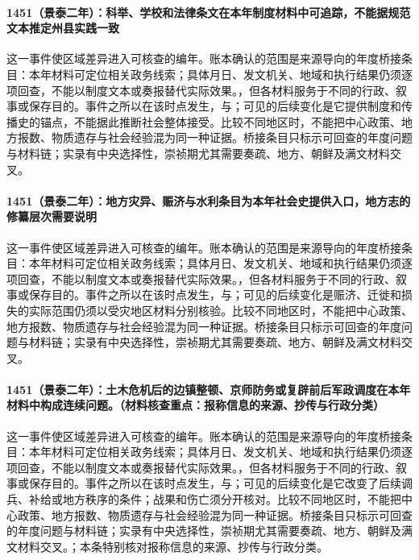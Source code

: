 \paragraph{1451（景泰二年）：科举、学校和法律条文在本年制度材料中可追踪，不能据规范文本推定州县实践一致} 这一事件使区域差异进入可核查的编年。账本确认的范围是来源导向的年度桥接条目：本年材料可定位相关政务线索；具体月日、发文机关、地域和执行结果仍须逐项回查，不能以制度文本或奏报替代实际效果。，但各材料服务于不同的行政、叙事或保存目的。事件之所以在该时点发生，与；可见的后续变化是它提供制度和传播史的锚点，不能据此推断社会整体接受。比较不同地区时，不能把中心政策、地方报数、物质遗存与社会经验混为同一种证据。桥接条目只标示可回查的年度问题与材料链；实录有中央选择性，崇祯期尤其需要奏疏、地方、朝鲜及满文材料交叉。

\paragraph{1451（景泰二年）：地方灾异、赈济与水利条目为本年社会史提供入口，地方志的修纂层次需要说明} 这一事件使区域差异进入可核查的编年。账本确认的范围是来源导向的年度桥接条目：本年材料可定位相关政务线索；具体月日、发文机关、地域和执行结果仍须逐项回查，不能以制度文本或奏报替代实际效果。，但各材料服务于不同的行政、叙事或保存目的。事件之所以在该时点发生，与；可见的后续变化是赈济、迁徙和损失的实际范围仍须以受灾地区材料分别核验。比较不同地区时，不能把中心政策、地方报数、物质遗存与社会经验混为同一种证据。桥接条目只标示可回查的年度问题与材料链；实录有中央选择性，崇祯期尤其需要奏疏、地方、朝鲜及满文材料交叉。

\paragraph{1451（景泰二年）：土木危机后的边镇整顿、京师防务或复辟前后军政调度在本年材料中构成连续问题。（材料核查重点：报称信息的来源、抄传与行政分类）} 这一事件使区域差异进入可核查的编年。账本确认的范围是来源导向的年度桥接条目：本年材料可定位相关政务线索；具体月日、发文机关、地域和执行结果仍须逐项回查，不能以制度文本或奏报替代实际效果。，但各材料服务于不同的行政、叙事或保存目的。事件之所以在该时点发生，与；可见的后续变化是它改变了后续调兵、补给或地方秩序的条件；战果和伤亡须分开核对。比较不同地区时，不能把中心政策、地方报数、物质遗存与社会经验混为同一种证据。桥接条目只标示可回查的年度问题与材料链；实录有中央选择性，崇祯期尤其需要奏疏、地方、朝鲜及满文材料交叉。；本条特别核对报称信息的来源、抄传与行政分类。

